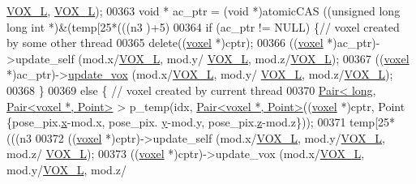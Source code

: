\begin{DoxyCode}
{      \hyperlink{Voxel_8hpp_a3c1c8b966e30fa8ca2de07abe3b3d74a}{VOX\_L}, \hyperlink{Voxel_8hpp_a3c1c8b966e30fa8ca2de07abe3b3d74a}{VOX\_L});
00363             \textcolor{keywordtype}{void} * ac\_ptr = (\textcolor{keywordtype}{void} *)atomicCAS ((\textcolor{keywordtype}{unsigned} \textcolor{keywordtype}{long} \textcolor{keywordtype}{long} \textcolor{keywordtype}{int} *)&(temp[25*(((n3%
      )+5)%
00364             \textcolor{keywordflow}{if} (ac\_ptr != NULL) \{\textcolor{comment}{// voxel created by some other thread}
00365                 \textcolor{keyword}{delete}((\hyperlink{classvoxel}{voxel} *)cptr);
00366                 ((\hyperlink{classvoxel}{voxel} *)ac\_ptr)->update\_self (mod.x/\hyperlink{Voxel_8hpp_a3c1c8b966e30fa8ca2de07abe3b3d74a}{VOX\_L}, mod.y/
      \hyperlink{Voxel_8hpp_a3c1c8b966e30fa8ca2de07abe3b3d74a}{VOX\_L}, mod.z/\hyperlink{Voxel_8hpp_a3c1c8b966e30fa8ca2de07abe3b3d74a}{VOX\_L});
00367                 ((\hyperlink{classvoxel}{voxel} *)ac\_ptr)->\hyperlink{classvoxel_ae550590cfe0d4c3d0e78cbf0cfa3390f}{update\_vox} (mod.x/\hyperlink{Voxel_8hpp_a3c1c8b966e30fa8ca2de07abe3b3d74a}{VOX\_L}, mod.y/
      \hyperlink{Voxel_8hpp_a3c1c8b966e30fa8ca2de07abe3b3d74a}{VOX\_L}, mod.z/\hyperlink{Voxel_8hpp_a3c1c8b966e30fa8ca2de07abe3b3d74a}{VOX\_L});
00368             \}
00369             \textcolor{keywordflow}{else} \{ \textcolor{comment}{// voxel created by current thread}
00370                 \hyperlink{classPair}{Pair< long, Pair<voxel *, Point>} > p\_temp(idx, 
      \hyperlink{classPair}{Pair<voxel *, Point>}((\hyperlink{classvoxel}{voxel} *)cptr, Point \{pose\_pix.\hyperlink{classquaternion_acdcda48f9dd7ff35873aae38fa33ab78}{x}-mod.x, pose\_pix.
      \hyperlink{classquaternion_a48e3d1fbf5e12eb54985c32b45dd8303}{y}-mod.y, pose\_pix.\hyperlink{classquaternion_a538598007238d399f79ddcecd39ef5cf}{z}-mod.z\}));
00371                 temp[25*(((n3%
00372                 ((\hyperlink{classvoxel}{voxel} *)cptr)->update\_self (mod.x/\hyperlink{Voxel_8hpp_a3c1c8b966e30fa8ca2de07abe3b3d74a}{VOX\_L}, mod.y/\hyperlink{Voxel_8hpp_a3c1c8b966e30fa8ca2de07abe3b3d74a}{VOX\_L}, mod.z/
      \hyperlink{Voxel_8hpp_a3c1c8b966e30fa8ca2de07abe3b3d74a}{VOX\_L});
00373                 ((\hyperlink{classvoxel}{voxel} *)cptr)->update\_vox (mod.x/\hyperlink{Voxel_8hpp_a3c1c8b966e30fa8ca2de07abe3b3d74a}{VOX\_L}, mod.y/\hyperlink{Voxel_8hpp_a3c1c8b966e30fa8ca2de07abe3b3d74a}{VOX\_L}, mod.z/
}
\end{DoxyCode}
